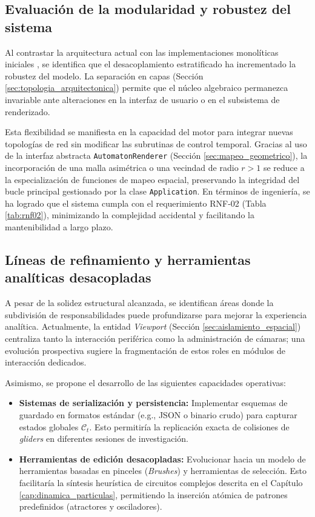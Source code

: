 \subsection{Evaluación de la modularidad y robustez del sistema}

Al contrastar la arquitectura actual con las implementaciones monolíticas iniciales \cite{Basurto2009}, se identifica que el desacoplamiento estratificado ha incrementado la robustez del modelo. La separación en capas (Sección \ref{sec:topologia_arquitectonica}) permite que el núcleo algebraico permanezca invariable ante alteraciones en la interfaz de usuario o en el subsistema de renderizado.

Esta flexibilidad se manifiesta en la capacidad del motor para integrar nuevas topologías de red sin modificar las subrutinas de control temporal. Gracias al uso de la interfaz abstracta \texttt{AutomatonRenderer} (Sección \ref{sec:mapeo_geometrico}), la incorporación de una malla asimétrica o una vecindad de radio $r > 1$ se reduce a la especialización de funciones de mapeo espacial, preservando la integridad del bucle principal gestionado por la clase \texttt{Application}. En términos de ingeniería, se ha logrado que el sistema cumpla con el requerimiento RNF-02 (Tabla \ref{tab:rnf02}), minimizando la complejidad accidental y facilitando la mantenibilidad a largo plazo.

\subsection{Líneas de refinamiento y herramientas analíticas desacopladas}

A pesar de la solidez estructural alcanzada, se identifican áreas donde la subdivisión de responsabilidades puede profundizarse para mejorar la experiencia analítica. Actualmente, la entidad \textit{Viewport} (Sección \ref{sec:aislamiento_espacial}) centraliza tanto la interacción periférica como la administración de cámaras; una evolución prospectiva sugiere la fragmentación de estos roles en módulos de interacción dedicados.

Asimismo, se propone el desarrollo de las siguientes capacidades operativas:
\begin{itemize}
    \item \textbf{Sistemas de serialización y persistencia:} Implementar esquemas de guardado en formatos estándar (e.g., JSON o binario crudo) para capturar estados globales $\mathcal{C}_t$. Esto permitiría la replicación exacta de colisiones de \textit{gliders} en diferentes sesiones de investigación.
    \item \textbf{Herramientas de edición desacopladas:} Evolucionar hacia un modelo de herramientas basadas en pinceles (\textit{Brushes}) y herramientas de selección. Esto facilitaría la síntesis heurística de circuitos complejos descrita en el Capítulo \ref{cap:dinamica_particulas}, permitiendo la inserción atómica de patrones predefinidos (atractores y osciladores).
\end{itemize}

